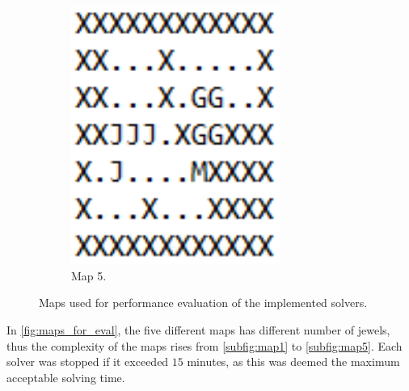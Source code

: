 \documentclass[../report.tex]{subfiles}
\begin{document}
\begin{figure}[H]
\begin{subfigure}[b]{0.19\textwidth}
        \includegraphics[width=0.75\textwidth]{figures/solver_design/map5.png}
        \captionsetup{width=0.9\textwidth}
        \caption{Map 5.}
        \label{subfig:map5}
    \end{subfigure}
    \caption{Maps used for performance evaluation of the implemented solvers.}
    \label{fig:maps_for_eval}
\end{figure}

In \autoref{fig:maps_for_eval}, the five different maps has different number of jewels, thus the complexity of the maps rises from \autoref{subfig:map1} to \autoref{subfig:map5}. Each solver was stopped if it exceeded $15$ minutes, as this was deemed the maximum acceptable solving time.

\begin{table}[H]
\centering
{}
\caption{Results of performance evaluation of the implemented solvers on the maps shown in \autoref{fig:maps_for_eval}.}
\label{tab:solver_results}
\end{table}
\end{document}
